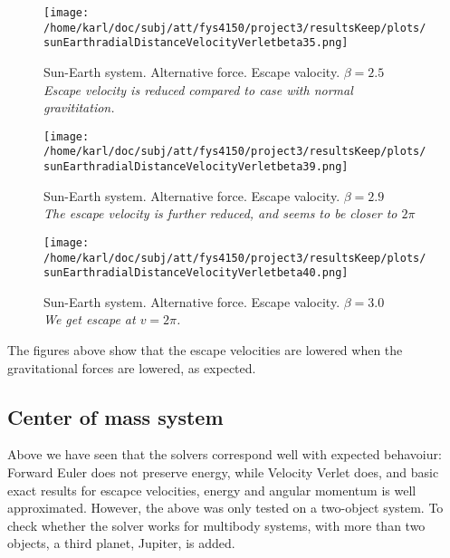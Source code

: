\documentclass{article}
\begin{document}
\begin{minipage}{.3\textwidth} 
	\begin{figure}[H]
		\centering
		\texttt{[image: /home/karl/doc/subj/att/fys4150/project3/resultsKeep/plots/sunEarthradialDistanceVelocityVerletbeta35.png]}
		\caption{Sun-Earth system. Alternative force. Escape valocity. $\beta = 2.5$ \\ \textit{Escape velocity is reduced compared to case with normal gravititation.}}
		\label{1}
	\end{figure}
\end{minipage}\hfill
\begin{minipage}{.3\textwidth} 
	\begin{figure}[H]
		\centering
		\texttt{[image: /home/karl/doc/subj/att/fys4150/project3/resultsKeep/plots/sunEarthradialDistanceVelocityVerletbeta39.png]}
		\caption{Sun-Earth system. Alternative force. Escape valocity. $\beta = 2.9$ \\ \textit{The escape velocity is further reduced, and seems to be closer to $2  \pi$}}
		\label{1}
	\end{figure}
\end{minipage}\hfill
\begin{minipage}{.3\textwidth} 
	\begin{figure}[H]
		\centering
		\texttt{[image: /home/karl/doc/subj/att/fys4150/project3/resultsKeep/plots/sunEarthradialDistanceVelocityVerletbeta40.png]}
		\caption{Sun-Earth system. Alternative force. Escape valocity. $\beta = 3.0$ \\ \textit{We get escape at $v = 2\pi$.}}
		\label{1}
	\end{figure}
\end{minipage}\hfill
\vspace{2ex}

The figures above show that the escape velocities are lowered when the gravitational forces are lowered, as expected.  

\subsection{Center of mass system}
Above we have seen that the solvers correspond well with expected behavoiur: Forward Euler does not preserve energy, while Velocity Verlet does, and basic exact results for escapce velocities, energy and angular momentum is well approximated. However, the above was only tested on a two-object system. To check whether the solver works for multibody systems, with more than two objects, a third planet, Jupiter, is added.\\
\end{document}
